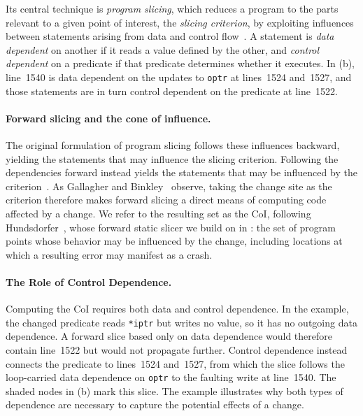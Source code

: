 Its central technique is \emph{program slicing}, which reduces a program to the
parts relevant to a given point of interest, the \emph{slicing criterion}, by
exploiting influences between statements arising from data and control
flow~\cite{weiserProgramSlicing1984}. A statement is \emph{data dependent} on
another if it reads a value defined by the other, and \emph{control dependent}
on a predicate if that predicate determines whether it executes. In
(b), line~1540 is data dependent on the updates to \texttt{optr}
at lines~1524 and~1527, and those statements are in turn control dependent on
the predicate at line~1522.

\paragraph{Forward slicing and the cone of influence.}
The original formulation of program slicing follows these influences backward,
yielding the statements that may influence the slicing criterion. Following the
dependencies forward instead yields the statements that may be influenced by the
criterion~\cite{horwitzInterproceduralSlicingUsing1990}. As Gallagher and
Binkley~\cite{gallagherProgramSlicing2008} observe, taking the change site as
the criterion therefore makes forward slicing a direct means of computing code
affected by a change. We refer to the resulting set as the \acf{CoI}, following
Hundsdorfer~\cite{zotero-item-324}, whose forward static slicer we build on in : the set of program points whose behavior may
be influenced by the change, including locations at which a resulting error may
manifest as a crash.

\paragraph{The Role of Control Dependence.}
Computing the \ac{CoI} requires both data and control dependence. In the
example, the changed predicate reads \texttt{*iptr} but writes no value, so it
has no outgoing data dependence. A forward slice based only on data dependence
would therefore contain line~1522 but would not propagate further. Control
dependence instead connects the predicate to lines~1524 and~1527, from which the
slice follows the loop-carried data dependence on \texttt{optr} to the faulting
write at line~1540. The shaded nodes in (b) mark this
slice. The example illustrates why both types of
dependence are necessary to capture the potential effects of a change.

